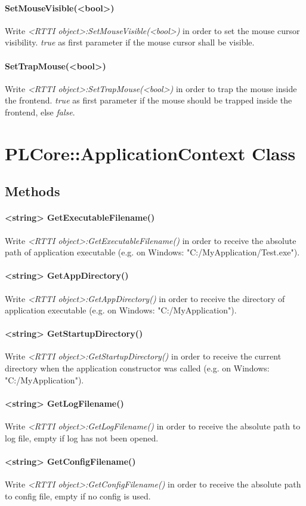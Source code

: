 \paragraph{SetMouseVisible(<bool>)}
Write \emph{<RTTI object>:SetMouseVisible(<bool>)} in order to set the mouse cursor visibility. \emph{true} as first parameter if the mouse cursor shall be visible.

\paragraph{SetTrapMouse(<bool>)}
Write \emph{<RTTI object>:SetTrapMouse(<bool>)} in order to trap the mouse inside the frontend. \emph{true} as first parameter if the mouse should be trapped inside the frontend, else \emph{false}.




\section{PLCore::ApplicationContext Class}


\subsection{Methods}

\paragraph{<string> GetExecutableFilename()}
Write \emph{<RTTI object>:GetExecutableFilename()} in order to receive the absolute path of application executable (e.g. on Windows: "C:/MyApplication/Test.exe").

\paragraph{<string> GetAppDirectory()}
Write \emph{<RTTI object>:GetAppDirectory()} in order to receive the directory of application executable (e.g. on Windows: "C:/MyApplication").

\paragraph{<string> GetStartupDirectory()}
Write \emph{<RTTI object>:GetStartupDirectory()} in order to receive the current directory when the application constructor was called (e.g. on Windows: "C:/MyApplication").

\paragraph{<string> GetLogFilename()}
Write \emph{<RTTI object>:GetLogFilename()} in order to receive the absolute path to log file, empty if log has not been opened.

\paragraph{<string> GetConfigFilename()}
Write \emph{<RTTI object>:GetConfigFilename()} in order to receive the absolute path to config file, empty if no config is used.
